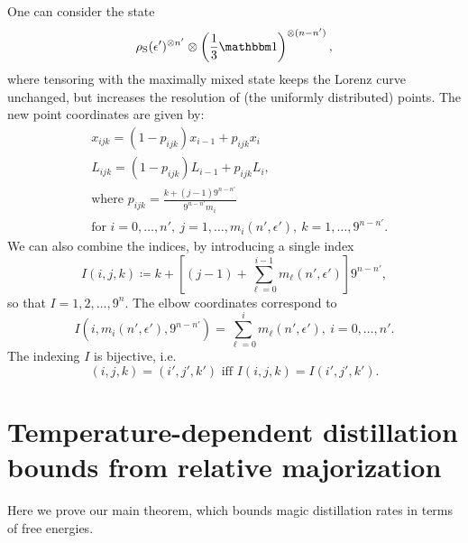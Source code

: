 \documentclass[pra,
aps,
twocolumn,
superscriptaddress,
groupedaddress,
nofootinbib,
reprint
]{revtex4-1}
\begin{document}
One can consider the state 
\begin{equation*}
\rho_{\rm{S}}(\epsilon')^{\otimes n'} \otimes \left( \frac{1}{3}\id \right)^{\otimes (n-n')},
\end{equation*}
where tensoring with the maximally mixed state keeps the Lorenz curve unchanged, but increases the resolution of (the uniformly distributed) points.
The new point coordinates are given by:
\begin{align}
    &x_{ijk} = \left( 1-p_{ijk}\right) x_{i-1} + p_{ijk} x_{i} \label{eq:lcsu_xcoord}\\
    &L_{ijk} = \left( 1-p_{ijk} \right) L_{i-1} + p_{ijk} L_{i}, \label{eq:lcsu_lcoord}\\
    &\text{where } p_{ijk} = \frac{k + (j-1)9^{n-n'}}{9^{n-n'} m_{i}} \nonumber\\
    &\text{for } i=0,\dots,n',\ j = 1,\dots,m_{i}(n', \epsilon'),\ k = 1,\dots,9^{n-n'}. \nonumber
\end{align}
We can also combine the indices, by introducing a single index
\begin{equation}
    I(i,j,k) \coloneqq k + \left[ (j-1) + \sum_{\ell=0}^{i-1} m_{\ell}(n', \epsilon') \right]9^{n-n'},
\end{equation}
so that $I=1,2,\dots, 9^{n}$.
The elbow coordinates correspond to 
\begin{equation}
	I(i, m_{i}(n', \epsilon'), 9^{n-n'}) = \sum_{\ell=0}^{i} m_{\ell}(n', \epsilon'),\ i= 0,\dots,n'.
\end{equation}
The indexing $I$ is bijective, i.e.
\begin{equation}
	(i,j,k) = (i',j',k') \text{ iff } I(i,j,k) = I(i',j',k').
\end{equation}

\section{Temperature-dependent distillation bounds from relative majorization}
\label{app:lcst_technical}

Here we prove our main theorem, which bounds magic distillation rates in terms of free energies.
\end{document}
